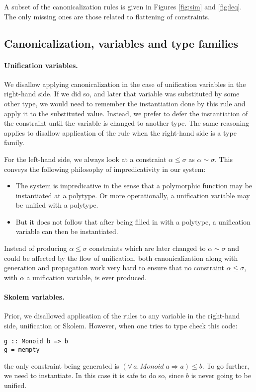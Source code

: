 \documentclass[12pt]{article}
\begin{document}
A subset of the canonicalization rules is given in Figures \ref{fig:sim} and \ref{fig:leq}. The only missing ones are those related to flattening of constraints.

\subsection{Canonicalization, variables and type families}

\paragraph{Unification variables.} We disallow applying canonicalization in the case of unification variables in the right-hand side. If we did so, and later that variable was substituted by some other type, we would need to remember the instantiation done by this rule and apply it to the substituted value. Instead, we prefer to defer the instantiation of the constraint until the variable is changed to another type. The same reasoning applies to disallow application of the rule when the right-hand side is a type family.

For the left-hand side, we always look at a constraint $\alpha \leq \sigma$ as $\alpha \sim \sigma$. This conveys the following philosophy of impredicativity in our system:
\begin{itemize}
\item The system is impredicative in the sense that a polymorphic function may be instantiated at a polytype. Or more operationally, a unification variable may be unified with a polytype.
\item But it does not follow that after being filled in with a polytype, a unification variable can then be instantiated.
\end{itemize}
Instead of producing $\alpha \leq \sigma$ constraints which are later changed to $\alpha \sim \sigma$ and could be affected by the flow of unification, both canonicalization along with generation and propagation work very hard to ensure that no constraint $\alpha \leq \sigma$, with $\alpha$ a unification variable, is ever produced.

\paragraph{Skolem variables.} Prior, we disallowed application of the rules to any variable in the right-hand side, unification or Skolem. However, when one tries to type check this code:
\begin{verbatim}
g :: Monoid b => b
g = mempty
\end{verbatim}
the only constraint being generated is $(\forall\, a.\, \textit{Monoid} \; a \Rightarrow a) \leq b$. To go further, we need to instantiate. In this case it is safe to do so, since $b$ is never going to be unified.
\end{document}
